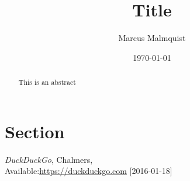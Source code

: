 \documentclass[12pt,a4paper]{article}
\begin{document}
\title{Title}
\author{Marcus Malmquist}
\date{\today}
\maketitle

\begin{abstract}
This is an abstract
\end{abstract}

\newpage
\tableofcontents
\newpage

\section{Section}


\newpage
\begin{thebibliography}{1}

 \emph{DuckDuckGo}, Chalmers,\\ Available:\hspace{5pt}\url{https://duckduckgo.com} [2016-01-18]

\end{thebibliography}
\end{document}
